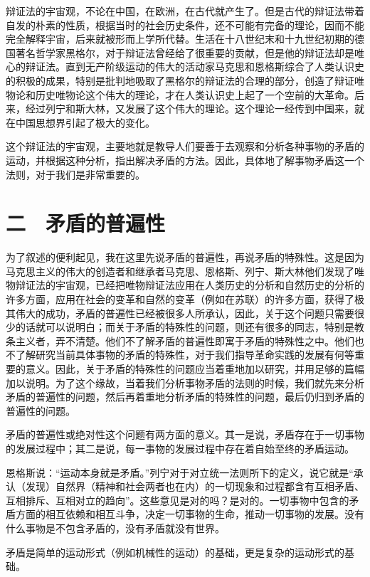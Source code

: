 辩证法的宇宙观，不论在中国，在欧洲，在古代就产生了。但是古代的辩证法带着自发的朴素的性质，根据当时的社会历史条件，还不可能有完备的理论，因而不能完全解释宇宙，后来就被形而上学所代替。生活在十八世纪末和十九世纪初期的德国著名哲学家黑格尔，对于辩证法曾经给了很重要的贡献，但是他的辩证法却是唯心的辩证法。直到无产阶级运动的伟大的活动家马克思和恩格斯综合了人类认识史的积极的成果，特别是批判地吸取了黑格尔的辩证法的合理的部分，创造了辩证唯物论和历史唯物论这个伟大的理论，才在人类认识史上起了一个空前的大革命。后来，经过列宁和斯大林，又发展了这个伟大的理论。这个理论一经传到中国来，就在中国思想界引起了极大的变化。

这个辩证法的宇宙观，主要地就是教导人们要善于去观察和分析各种事物的矛盾的运动，并根据这种分析，指出解决矛盾的方法。因此，具体地了解事物矛盾这一个法则，对于我们是非常重要的。

\section{二　矛盾的普遍性}

为了叙述的便利起见，我在这里先说矛盾的普遍性，再说矛盾的特殊性。这是因为马克思主义的伟大的创造者和继承者马克思、恩格斯、列宁、斯大林他们发现了唯物辩证法的宇宙观，已经把唯物辩证法应用在人类历史的分析和自然历史的分析的许多方面，应用在社会的变革和自然的变革（例如在苏联）的许多方面，获得了极其伟大的成功，矛盾的普遍性已经被很多人所承认，因此，关于这个问题只需要很少的话就可以说明白；而关于矛盾的特殊性的问题，则还有很多的同志，特别是教条主义者，弄不清楚。他们不了解矛盾的普遍性即寓于矛盾的特殊性之中。他们也不了解研究当前具体事物的矛盾的特殊性，对于我们指导革命实践的发展有何等重要的意义。因此，关于矛盾的特殊性的问题应当着重地加以研究，并用足够的篇幅加以说明。为了这个缘故，当着我们分析事物矛盾的法则的时候，我们就先来分析矛盾的普遍性的问题，然后再着重地分析矛盾的特殊性的问题，最后仍归到矛盾的普遍性的问题。

矛盾的普遍性或绝对性这个问题有两方面的意义。其一是说，矛盾存在于一切事物的发展过程中；其二是说，每一事物的发展过程中存在着自始至终的矛盾运动。

恩格斯说：“运动本身就是矛盾。”列宁对于对立统一法则所下的定义，说它就是“承认（发现）自然界（精神和社会两者也在内）的一切现象和过程都含有互相矛盾、互相排斥、互相对立的趋向”。这些意见是对的吗？是对的。一切事物中包含的矛盾方面的相互依赖和相互斗争，决定一切事物的生命，推动一切事物的发展。没有什么事物是不包含矛盾的，没有矛盾就没有世界。

矛盾是简单的运动形式（例如机械性的运动）的基础，更是复杂的运动形式的基础。

